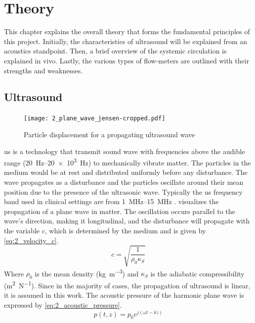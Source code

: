 \chapter{Theory} \label{cha:theory} %
This chapter explains the overall theory that forms the fundamental principles of this project. Initially, the characteristics of ultrasound will be explained from an acoustics standpoint. Then, a brief overview of the systemic circulation is explained in vivo. Lastly, the various types of flow-meters are outlined with their strengths and weaknesses.
\section{Ultrasound}
\begin{figure}[htbp]
	\centering
	\texttt{[image: 2\_plane\_wave\_jensen-cropped.pdf]}
	\caption[Particle displacement for a propagating ultrasound wave]{Particle displacement for a propagating ultrasound wave \cite{JensenUltrasoundBook}}
	\label{fig:2_planewave_jensen}
\end{figure}
\gls{us} is a technology that transmit sound wave with frequencies above the audible range (\qtyrange[range-units = single]{20}{20e3}{\hertz}) to mechanically vibrate matter. The particles in the medium would be at rest and distributed uniformly before any disturbance. The wave propagates as a disturbance and the particles oscillate around their mean position due to the presence of the ultrasonic wave. Typically the \gls{us} frequency band used in clinical settings are from \qtyrange[range-units = single]{1}{15}{\mega\hertz} \cite{Szabo_UltrasoundBook_2}.  visualizes the propagation of a plane wave in matter. The oscillation occurs parallel to the wave's direction, making it longitudinal, and the disturbance will propagate with the variable $c$, which is determined by the medium and is given by \cref{eq:2_velocity_c}.
\begin{equation} \label{eq:2_velocity_c}
	c = \sqrt{\frac{1}{\rho_{0} \kappa_{S}}}
\end{equation}
Where $\rho_{0}$ is the mean density (\unit{\kilogram\per\meter\cubed}) and $\kappa_{S}$ is the \gls{adiabatic} compressibility (\unit{\meter\squared\per\newton}). Since in the majority of cases, the propagation of ultrasound is linear, it is assumed in this work. The acoustic pressure of the harmonic plane wave is expressed by \cref{eq:2_acoustic_pressure}. \raggedbottom
\begin{equation} \label{eq:2_acoustic_pressure}
	p(t,z)=p_{0} e^{j(\omega t - k z)}
\end{equation}
